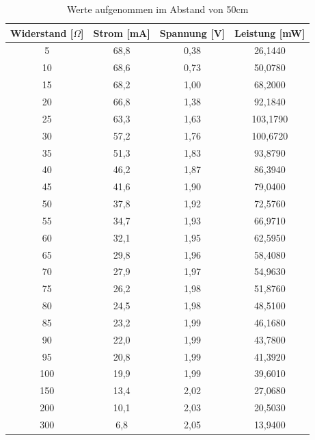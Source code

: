 \begin{table}[H]
\begin{tabular}{|c|c|c|c|}
\hline 
Widerstand [$\Omega$]	&Strom [mA]	&Spannung [V]	&Leistung [mW]\\	 
\hline 
5	&68,8	&0,38	&26,1440\\
10	&68,6	&0,73	&50,0780\\
15	&68,2	&1,00	&68,2000\\
20	&66,8	&1,38	&92,1840\\
25	&63,3	&1,63	&103,1790\\
30	&57,2	&1,76	&100,6720\\
35	&51,3	&1,83	&93,8790\\
40	&46,2	&1,87	&86,3940\\
45	&41,6	&1,90	&79,0400\\
50	&37,8	&1,92	&72,5760\\
55	&34,7	&1,93	&66,9710\\
60	&32,1	&1,95	&62,5950\\
65	&29,8	&1,96	&58,4080\\
70	&27,9	&1,97	&54,9630\\
75	&26,2	&1,98	&51,8760\\
80	&24,5	&1,98	&48,5100\\
85	&23,2	&1,99	&46,1680\\
90	&22,0	&1,99	&43,7800\\
95	&20,8	&1,99	&41,3920\\
100	&19,9	&1,99	&39,6010\\
150	&13,4	&2,02	&27,0680\\
200	&10,1	&2,03	&20,5030\\
300	&6,8	&2,05	&13,9400\\
\hline 
\end{tabular}
\caption{Werte aufgenommen im Abstand von 50cm}
\end{table}

